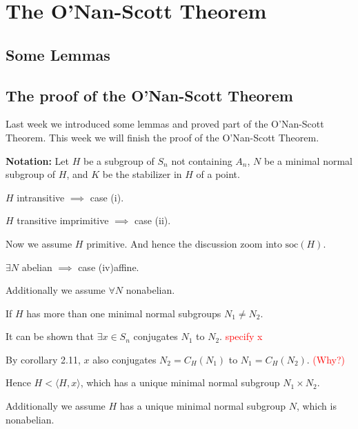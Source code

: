 \documentclass[a4paper,11pt]{article}
\def\maintitle#1{\section*{#1}}
\def\subtitle#1{\section{#1}}
\begin{document}
\else %
    \ifx\chaptitle\undefined %
        \def\maintitle#1{\subsection{#1}}
        \def\subtitle#1{\subsubsection{#1}}
    \else %
        \def\maintitle#1{\section{#1}}
        \def\subtitle#1{\subsection{#1}}
    \fi
\fi


\maintitle{The O'Nan-Scott Theorem}
\subtitle{Some Lemmas}
\subtitle{The proof of the O'Nan-Scott Theorem}

Last week we introduced some lemmas and proved part of the O'Nan-Scott Theorem. This week we will finish the proof of the O'Nan-Scott Theorem.

\noindent\textbf{Notation:} Let $H$ be a subgroup of $S_n$ not containing $A_n$, $N$ be a minimal normal subgroup of $H$, and $K$ be the stabilizer in $H$ of a point.

$H$ intransitive $\implies$ case (i).

$H$ transitive imprimitive $\implies$ case (ii).

\noindent Now we assume $H$ primitive. And hence the discussion zoom into $\mathrm{soc}(H)$.

$\exists N$ abelian $\implies$ case (iv)affine.

\noindent Additionally we assume $\forall N$ nonabelian. 

If $H$ has more than one minimal normal subgroups $N_1\neq N_2$. 

It can be shown that $\exists x\in S_n$ conjugates $N_1$ to $N_2$. \textcolor{red}{specify x}

By corollary 2.11, $x$ also conjugates $N_2=C_H(N_1)$ to $N_1=C_H(N_2)$. \textcolor{red}{(Why?)} 

Hence $H<\langle H,x\rangle$, which has a unique minimal normal subgroup $N_1\times N_2$.

\noindent Additionally we assume $H$ has a unique minimal normal subgroup $N$, which is nonabelian.
\end{document}
